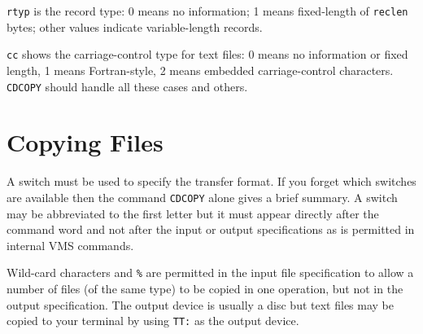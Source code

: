 {\tt rtyp} is the record type: 0 means no information; 1 means
fixed-length of {\tt reclen} bytes; other values indicate
variable-length records. 

{\tt cc} shows the carriage-control type for text files: 0 means no
information or fixed length, 1 means Fortran-style, 2 means embedded
carriage-control characters.  {\tt CDCOPY} should handle all these cases
and others. 

\section{Copying Files}
A switch must be used to specify the transfer format.  If you forget
which switches are available then the command {\tt CDCOPY} alone gives a
brief summary.  A switch may be abbreviated to the first letter but it must
appear directly after the command word and not after the input or output
specifications as is permitted in internal VMS commands. 

Wild-card characters {\tt *} and {\tt \%} are permitted in the input
file specification to allow a number of files (of the same type) to be
copied in one operation, but not in the output specification.
The output device is usually a disc but text files may be
copied to your terminal by using {\tt TT:} as the output device.

